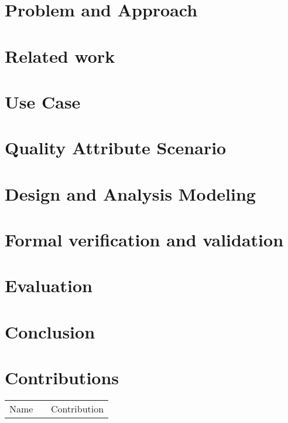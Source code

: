 \documentclass[conference]{IEEEtran}
\begin{document}
\section{Problem and Approach}
\label{sec:problem}


\section{Related work}
\label{sec:related_work}


\section{Use Case}
\label{sec:use_case}


\section{Quality Attribute Scenario}
\label{sec:qas}


\section{Design and Analysis Modeling}
\label{sec:design_and_analysis_modeling}



\section{Formal verification and validation}
\label{sec:formal_v_and_v}


\section{Evaluation}
\label{sec:evaluation}



\section{Conclusion}
\label{sec:conclusion}





\vspace{12pt}

\newpage
\section*{Contributions}
\begin{tabular}{l|p{0.6\linewidth}}
Name & Contribution\\
\end{tabular}
\end{document}
